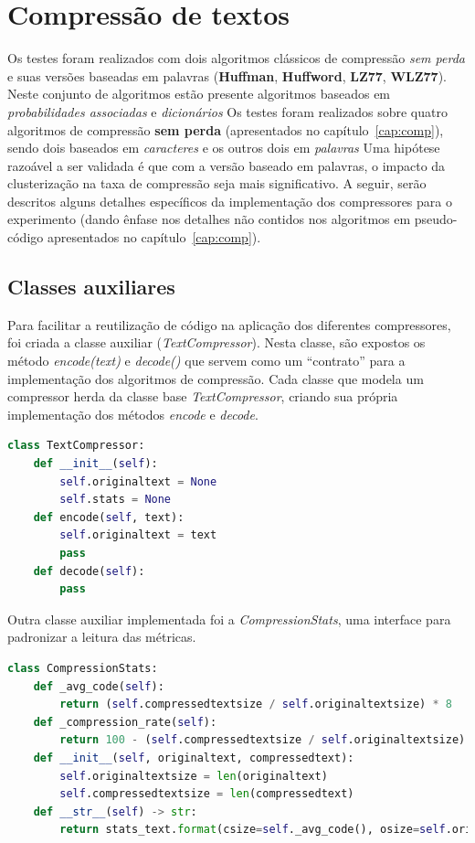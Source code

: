 \section{Compressão de textos}
Os testes foram realizados com dois algoritmos clássicos de compressão \emph{sem perda} e suas versões baseadas em palavras (\textbf{Huffman}, \textbf{Huffword}, \textbf{LZ77}, \textbf{WLZ77}).
Neste conjunto de algoritmos estão presente algoritmos baseados em \emph{probabilidades associadas} e \emph{dicionários}
Os testes foram realizados sobre quatro algoritmos de compressão \textbf{sem perda} (apresentados no capítulo~\ref{cap:comp}), sendo dois baseados em \emph{caracteres} e os outros dois em \emph{palavras}
Uma hipótese razoável a ser validada é que com a versão baseado em palavras, o impacto da clusterização na taxa de compressão seja mais significativo.
A seguir, serão descritos alguns detalhes específicos da implementação dos compressores para o experimento (dando ênfase nos detalhes não contidos nos algoritmos em pseudo-código apresentados no capítulo~\ref{cap:comp}).

\subsection{Classes auxiliares}
Para facilitar a reutilização de código na aplicação dos diferentes compressores, foi criada a classe auxiliar (\emph{TextCompressor}).
Nesta classe, são expostos os método \emph{encode(text)} e \emph{decode()} que servem como um ``contrato'' para a implementação dos algoritmos de compressão.
Cada classe que modela um compressor herda da classe base \emph{TextCompressor}, criando sua própria implementação dos métodos \emph{encode} e \emph{decode}.


\begin{lstlisting}[language=Python, caption=Classe TextCompressor]
class TextCompressor:
    def __init__(self):
        self.originaltext = None
        self.stats = None
    def encode(self, text):
        self.originaltext = text
        pass
    def decode(self):
        pass
\end{lstlisting}

Outra classe auxiliar implementada foi a \emph{CompressionStats}, uma interface para padronizar a leitura das métricas.

\begin{lstlisting}[language=Python, caption=Implementaçào da classe base CompressionStats]
class CompressionStats:
    def _avg_code(self):
        return (self.compressedtextsize / self.originaltextsize) * 8
    def _compression_rate(self):
        return 100 - (self.compressedtextsize / self.originaltextsize) * 100
    def __init__(self, originaltext, compressedtext):
        self.originaltextsize = len(originaltext)
        self.compressedtextsize = len(compressedtext)
    def __str__(self) -> str:
        return stats_text.format(csize=self._avg_code(), osize=self.originaltextsize, nsize=self.compressedtextsize, crate=self._compression_rate())
\end{lstlisting}

